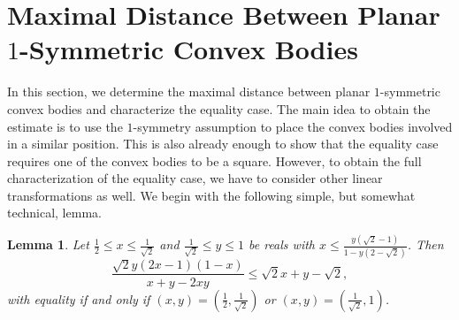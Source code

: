 \documentclass[12pt,a4paper]{article}
\newtheorem{lem}[twr]{Lemma}
\theoremstyle{definition}
\begin{document}
\section{Maximal Distance Between Planar \texorpdfstring{$1$}{1}-Symmetric Convex Bodies}
\label{sec:1sym}



In this section, we determine the maximal distance between planar $1$-symmetric convex bodies and characterize the equality case. The main idea to obtain the estimate is to use the $1$-symmetry assumption to place the convex bodies involved in a similar position. This is also already enough to show that the equality case requires one of the convex bodies to be a square. However, to obtain the full characterization of the equality case, we have to consider other linear transformations as well. We begin with the following simple, but somewhat technical, lemma.

\begin{lem}
\label{lem:stab_ineq}
Let $\frac{1}{2} \leq x \leq \frac{1}{\sqrt{2}}$ and $\frac{1}{\sqrt{2}} \leq y \leq 1$ be reals with $x \leq \frac{y(\sqrt{2}-1)}{1-y(2-\sqrt{2})}$. Then
$$\frac{\sqrt{2}y(2x-1)(1-x)}{x + y - 2xy} \leq \sqrt{2} x + y - \sqrt{2},$$
with equality if and only if $(x,y) = \left( \frac{1}{2}, \frac{1}{\sqrt{2}} \right)$ or $(x,y) = \left( \frac{1}{\sqrt{2}},1 \right)$.
\end{lem}
\end{document}
